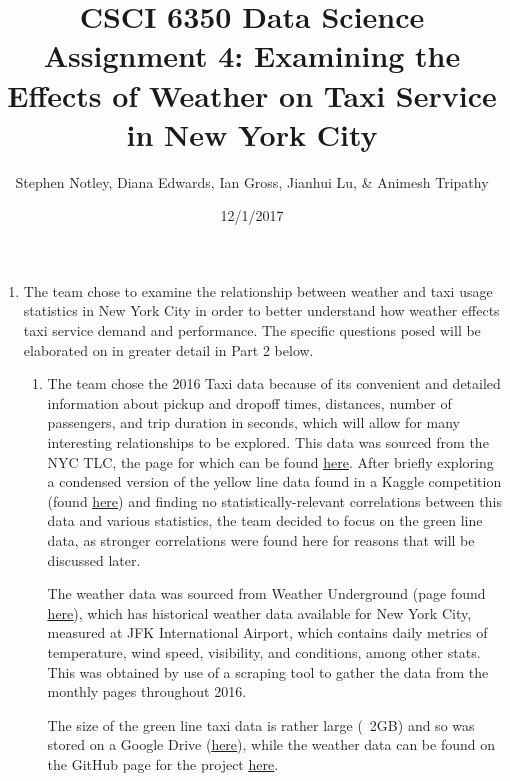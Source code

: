 \documentclass{article}
\title{CSCI 6350 Data Science Assignment 4: Examining the Effects of Weather on Taxi Service in New York City}
\author{Stephen Notley, Diana Edwards, Ian Gross, Jianhui Lu, \& Animesh Tripathy}
\date{12/1/2017}
\begin{document}
\maketitle

\begin{enumerate}

    \item %

    The team chose to examine the relationship between weather and taxi usage statistics in New York City in order to better understand how weather effects taxi service demand and performance. The specific questions posed will be elaborated on in greater detail in Part 2 below.

    \begin{enumerate}

        \item %
        The team chose the 2016 Taxi data because of its convenient and detailed information about pickup and dropoff times, distances, number of passengers, and trip duration in seconds, which will allow for many interesting relationships to be explored. This data was sourced from the NYC TLC, the page for which can be found \href{http://www.nyc.gov/html/tlc/html/about/trip_record_data.shtml}{\underline{here}}. After briefly exploring a condensed version of the yellow line data found in a Kaggle competition (found \href{https://www.kaggle.com/c/nyc-taxi-trip-duration/data}{\underline{here}}) and finding no statistically-relevant correlations between this data and various statistics, the team decided to focus on the green line data, as stronger correlations were found here for reasons that will be discussed later.

        The weather data was sourced from Weather Underground (page found \href{https://www.wunderground.com/history/airport/KJFK/2016/1/2/MonthlyHistory.html?&reqdb.zip=&reqdb.magic=&reqdb.wmo=}{\underline{here}}), which has historical weather data available for New York City, measured at JFK International Airport, which contains daily metrics of temperature, wind speed, visibility, and conditions, among other stats. This was obtained by use of a scraping tool to gather the data from the monthly pages throughout 2016.

        The size of the green line taxi data is rather large (~2GB) and so was stored on a Google Drive (\href{https://drive.google.com/file/d/1wPVIqUaaxgLZLQ8ahNiXleMFAO_wE2b2/view?usp=sharing}{\underline{here}}), while the weather data can be found on the GitHub page for the project \href{https://github.com/IanGross/NYC_Transportation_Weather_Study}{\underline{here}}. %


\end{enumerate}
\end{enumerate}
\end{document}
